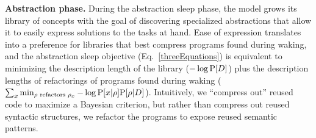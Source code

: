 \documentclass[12pt]{article}
\begin{document}


{\bf Abstraction phase.} During the abstraction sleep phase, %
the model grows its library of concepts with the goal of discovering specialized abstractions that allow it to easily
express solutions to the tasks at hand.
Ease of expression translates into a preference for libraries that best compress
programs found during waking,
and the abstraction sleep objective (Eq.~\ref{threeEquations})
is equivalent to minimizing the description  length of the library
($-\log \text{P}[D]$)
plus the description lengths of
refactorings of programs found during waking
($\sum_x\min_{\rho\text{ refactors }\rho_x}-\log \text{P}[x|\rho]\text{P}[\rho|D]$).
Intuitively,
we ``compress out'' reused code to maximize a Bayesian criterion,
but rather than compress out reused syntactic structures,
we refactor the programs to expose
reused semantic patterns.
\end{document}
